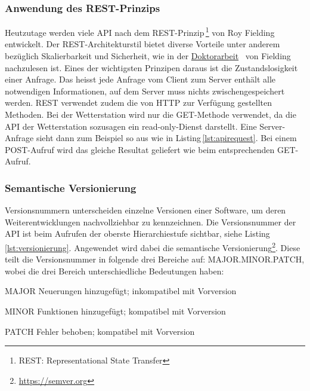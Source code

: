 \subsubsection{Anwendung des REST-Prinzips}
Heutzutage werden viele API nach dem REST-Prinzip\,\footnote{REST: Representational State Transfer} von Roy Fielding entwickelt. Der REST-Architekturstil bietet diverse Vorteile unter anderem bezüglich Skalierbarkeit und Sicherheit, wie in der \href{https://www.ics.uci.edu/~fielding/pubs/dissertation/top.htm}{Doktorarbeit}~\cite{Fielding:2000:ASD:932295} von Fielding nachzulesen ist. Eines der wichtigsten Prinzipen daraus ist die Zustandslosigkeit einer Anfrage. Das heisst jede Anfrage vom Client zum Server enthält alle notwendigen Informationen, auf dem Server muss nichts zwischengespeichert werden. REST verwendet zudem die von HTTP zur Verfügung gestellten Methoden\cite{LornaJaneMitchell2013oreilly}. Bei der Wetterstation wird nur die GET-Methode verwendet, da die API der Wetterstation sozusagen ein read-only-Dienst darstellt. Eine Server-Anfrage sieht dann zum Beispiel so aus wie in Listing\,\ref{lst:apirequest}. Bei einem POST-Aufruf wird das gleiche Resultat geliefert wie beim entsprechenden GET-Aufruf.




\subsubsection{Semantische Versionierung}
Versionsnummern unterscheiden einzelne Versionen einer Software, um deren Weiterentwicklungen nachvollziehbar zu kennzeichnen. Die Versionsnummer der API ist beim Aufrufen der oberste Hierarchiestufe sichtbar, siehe Listing\,\ref{lst:versionierung}. Angewendet wird dabei die semantische Versionierung\footnote{\url{https://semver.org}}. Diese teilt die Versionsnummer in folgende drei Bereiche auf: MAJOR.MINOR.PATCH, wobei die drei Bereich unterschiedliche Bedeutungen haben:

\begin{description*}
  \item[MAJOR] Neuerungen hinzugefügt; inkompatibel mit Vorversion
  \item[MINOR] Funktionen hinzugefügt; kompatibel mit Vorversion
  \item[PATCH] Fehler behoben; kompatibel mit Vorversion
\end{description*}

